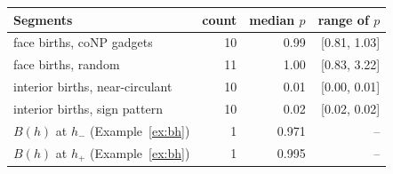 \begin{tabular}{@{}lrrr@{}}
\toprule
Segments & count & median $p$ & range of $p$ \\
\midrule
face births, coNP gadgets & 10 & 0.99 & [0.81, 1.03] \\
face births, random & 11 & 1.00 & [0.83, 3.22] \\
interior births, near-circulant & 10 & 0.01 & [0.00, 0.01] \\
interior births, sign pattern & 10 & 0.02 & [0.02, 0.02] \\
$B(h)$ at $h_{-}$ (Example~\ref{ex:bh}) & 1 & 0.971 & -- \\
$B(h)$ at $h_{+}$ (Example~\ref{ex:bh}) & 1 & 0.995 & -- \\
\bottomrule
\end{tabular}
